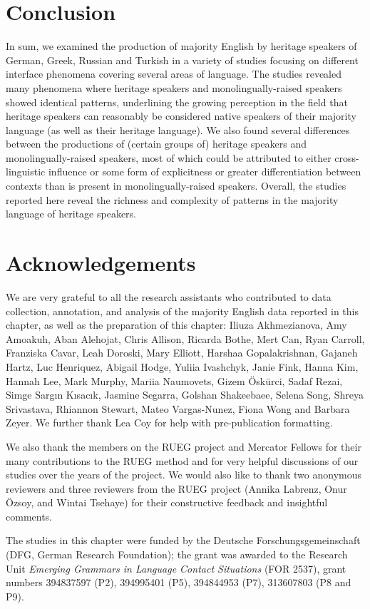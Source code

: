 \documentclass[output=paper,colorlinks,citecolor=brown]{langscibook}
\begin{document}
\section{Conclusion} \label{sec:pashkovaetal:Conclusion}

In sum, we examined the production of majority English by heritage speakers of German, Greek, Russian and Turkish in a variety of studies focusing on different interface phenomena covering several areas of language. The studies revealed many phenomena where heritage speakers and monolingually\hyp raised speakers showed identical patterns, underlining the growing perception in the field that heritage speakers can reasonably be considered native speakers of their majority language (as well as their heritage language). We also found several differences between the productions of (certain groups of) heritage speakers and monolingually-raised speakers, most of which could be attributed to either cross-linguistic influence or some form of explicitness or greater differentiation between contexts than is present in monolingually-raised speakers. Overall, the studies reported here reveal the richness and complexity of patterns in the majority language of heritage speakers.


\section*{Acknowledgements}

We are very grateful to all the research assistants who contributed to data collection, annotation, and analysis of the majority English data reported in this chapter, as well as the preparation of this chapter: 
Iliuza Akhmezianova,
Amy Amoakuh,
Aban Alehojat,
Chris Allison, 
Ricarda Bothe, 
Mert Can,
Ryan Carroll, 
Franziska Cavar, 
Leah Doroski, 
Mary Elliott, 
Harshaa Gopalakrishnan, 
Gajaneh Hartz, 
Luc Henriquez, 
Abigail Hodge, 
Yuliia Ivashchyk, 
Janie Fink, 
Hanna Kim, 
Hannah Lee,
Mark Murphy, 
Mariia Naumovets, 
Gizem Öskürci,
Sadaf Rezai, 
Simge Sargın Kısacık, 
Jasmine Segarra, 
Golshan Shakeebaee,
Selena Song, 
Shreya Srivastava,
Rhiannon Stewart,
Mateo Vargas-Nunez,
Fiona Wong and Barbara Zeyer.
We further thank Lea Coy for help with pre-publication formatting.

We also thank the members on the RUEG project and Mercator Fellows for their many contributions to the RUEG method and for very helpful discussions of our studies over the years of the project. We would also like to thank two anonymous reviewers and three reviewers from the RUEG project (Annika Labrenz, Onur Özsoy, and Wintai Tsehaye) for their constructive feedback and insightful comments. 

The studies in this chapter were funded by the Deutsche Forschungsgemeinschaft (DFG, German Research Foundation); the grant was awarded to the Research Unit \textit{Emerging Grammars in Language Contact Situations} (FOR 2537), grant numbers 394837597 (P2), 394995401 (P5), 394844953 (P7), 313607803 (P8 and P9).

\sloppy
\printbibliography[heading=subbibliography,notkeyword=this]
\end{document}
